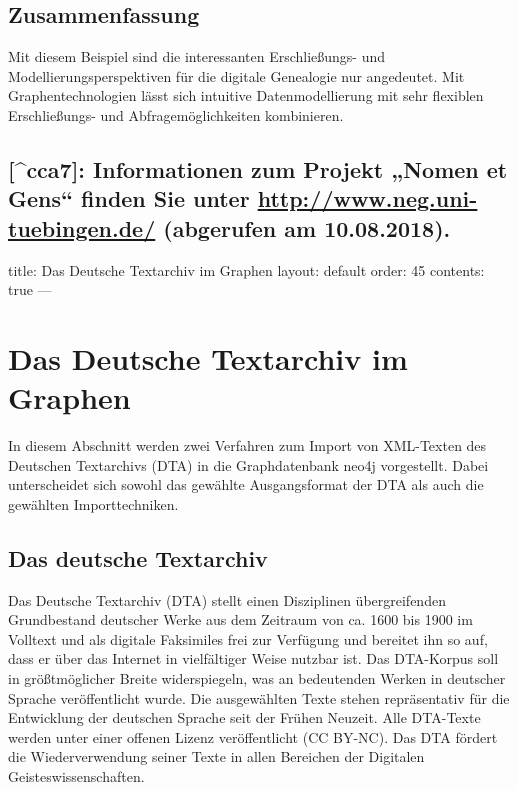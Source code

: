 \documentclass[12pt,ngerman,]{article}
\begin{document}
\subsection{Zusammenfassung}\label{zusammenfassung-4}

Mit diesem Beispiel sind die interessanten Erschließungs- und
Modellierungsperspektiven für die digitale Genealogie nur angedeutet.
Mit Graphentechnologien lässt sich intuitive Datenmodellierung mit sehr
flexiblen Erschließungs- und Abfragemöglichkeiten kombinieren.

\subsection{\texorpdfstring{{[}\^{}cca7{]}: Informationen zum Projekt
„Nomen et Gens`` finden Sie unter \url{http://www.neg.uni-tuebingen.de/}
(abgerufen am
10.08.2018).}{{[}\^{}cca7{]}: Informationen zum Projekt „Nomen et Gens`` finden Sie unter http://www.neg.uni-tuebingen.de/ (abgerufen am 10.08.2018).}}\label{cca7-informationen-zum-projekt-nomen-et-gens-finden-sie-unter-httpwww.neg.uni-tuebingen.de-abgerufen-am-10.08.2018.}

title: Das Deutsche Textarchiv im Graphen layout: default order: 45
contents: true ---

\section{Das Deutsche Textarchiv im
Graphen}\label{das-deutsche-textarchiv-im-graphen}

In diesem Abschnitt werden zwei Verfahren zum Import von XML-Texten des
Deutschen Textarchivs (DTA) in die Graphdatenbank neo4j vorgestellt.
Dabei unterscheidet sich sowohl das gewählte Ausgangsformat der DTA als
auch die gewählten Importtechniken.

\subsection{Das deutsche Textarchiv}\label{das-deutsche-textarchiv}

Das Deutsche Textarchiv (DTA) stellt einen Disziplinen übergreifenden
Grundbestand deutscher Werke aus dem Zeitraum von ca. 1600 bis 1900 im
Volltext und als digitale Faksimiles frei zur Verfügung und bereitet ihn
so auf, dass er über das Internet in vielfältiger Weise nutzbar ist. Das
DTA-Korpus soll in größtmöglicher Breite widerspiegeln, was an
bedeutenden Werken in deutscher Sprache veröffentlicht wurde. Die
ausgewählten Texte stehen repräsentativ für die Entwicklung der
deutschen Sprache seit der Frühen Neuzeit. Alle DTA-Texte werden unter
einer offenen Lizenz veröffentlicht (CC BY-NC). Das DTA fördert die
Wiederverwendung seiner Texte in allen Bereichen der Digitalen
Geisteswissenschaften.
\end{document}
